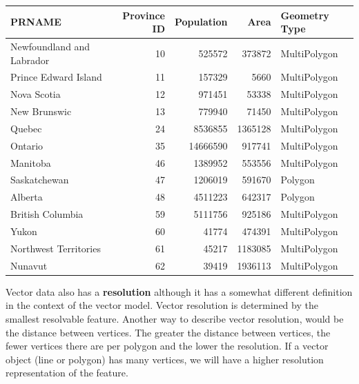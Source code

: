 \documentclass[
]{book}
\begin{document}
\begin{longtable}[]{@{}lrrrl@{}}
\toprule\noalign{}
PRNAME & Province ID & Population & Area & Geometry Type \\
\midrule\noalign{}
\endhead
\bottomrule\noalign{}
\endlastfoot
Newfoundland and Labrador & 10 & 525572 & 373872 & MultiPolygon \\
Prince Edward Island & 11 & 157329 & 5660 & MultiPolygon \\
Nova Scotia & 12 & 971451 & 53338 & MultiPolygon \\
New Brunswic & 13 & 779940 & 71450 & MultiPolygon \\
Quebec & 24 & 8536855 & 1365128 & MultiPolygon \\
Ontario & 35 & 14666590 & 917741 & MultiPolygon \\
Manitoba & 46 & 1389952 & 553556 & MultiPolygon \\
Saskatchewan & 47 & 1206019 & 591670 & Polygon \\
Alberta & 48 & 4511223 & 642317 & Polygon \\
British Columbia & 59 & 5111756 & 925186 & MultiPolygon \\
Yukon & 60 & 41774 & 474391 & MultiPolygon \\
Northwest Territories & 61 & 45217 & 1183085 & MultiPolygon \\
Nunavut & 62 & 39419 & 1936113 & MultiPolygon \\
\end{longtable}

Vector data also has a \textbf{resolution} although it has a somewhat different definition in the context of the vector model. Vector resolution is determined by the smallest resolvable feature. Another way to describe vector resolution, would be the distance between vertices. The greater the distance between vertices, the fewer vertices there are per polygon and the lower the resolution. If a vector object (line or polygon) has many vertices, we will have a higher resolution representation of the feature.
\end{document}
